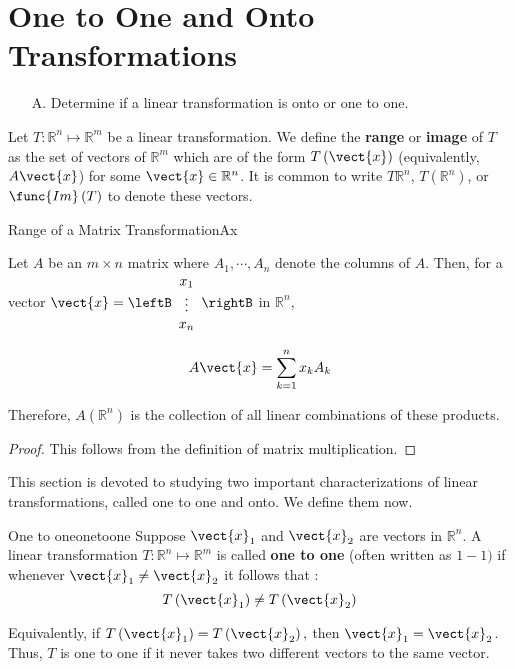 \section{One to One and Onto Transformations}

\begin{outcome}
\begin{enumerate}
\item[A.]  Determine if a linear transformation is onto or one to one.
\end{enumerate}
\end{outcome}

Let $T: \mathbb{R}^n \mapsto \mathbb{R}^m$ be a linear transformation. We define the \textbf{range} or \textbf{image} of $T$ as the set of vectors of $\mathbb{R}^{m}$ which are of the form
$T \left(\vect{x}\right)$ (equivalently, $A\vect{x}$) for some $\vect{x}\in \mathbb{R}^{n}$. It is common
to write $T\mathbb{R}^{n}$, $T\left( \mathbb{R}^{n}\right)$, or
$\func{Im}\left( T\right) $ to denote these vectors.  

\begin{lemma}{Range of a Matrix Transformation}{Ax}

Let $A$ be an $m\times n$ matrix where $A_{1},\cdots , A_{n}$ denote the columns of
$A$. Then, for a vector $\vect{x}=\leftB 
\begin{array}{c}
x_{1} \\
\vdots \\
 x_{n}
\end{array}
\rightB$ in $\mathbb{R}^n$,

\begin{equation*}
A\vect{x}=\sum_{k=1}^{n}x_{k}A_{k}
\end{equation*}

Therefore, $A \left( \mathbb{R}^n \right)$ is the collection of all
linear combinations of these products.
\end{lemma}

\begin{proof}
This follows from the definition of matrix multiplication.
\end{proof}

This section is devoted to studying two important characterizations of linear transformations, called one to one and onto. We define them now. 

\begin{definition}{One to one}{onetoone}
Suppose $\vect{x}_1$ and $\vect{x}_2$ are vectors in $\mathbb{R}^n$. A linear transformation $T: \mathbb{R}^n \mapsto \mathbb{R}^m$ is called \textbf{one to one} (often written as $1-1)$ if whenever
 $\vect{x}_1 \neq \vect{x}_2$ it follows that :
\begin{equation*}
T\left( \vect{x}_1 \right) \neq T \left(\vect{x}_2\right)
\end{equation*}

Equivalently, if $T\left( \vect{x}_1 \right) =T\left( \vect{x}_2\right) ,$
then $\vect{x}_1 = \vect{x}_2$. Thus,  $T$ is one to one if it never takes two different
vectors to the same vector.
\end{definition}

